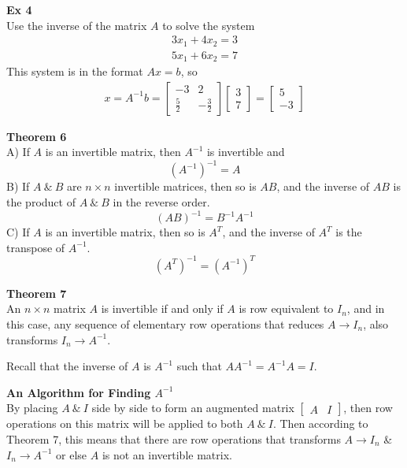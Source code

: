 \documentclass{article}
\begin{document}
  \textbf{Ex 4}\\
  Use the inverse of the matrix $ A $ to solve the system
  \[
      \begin{gathered}
      3x_{1}+4x_{2}=3\\
      5x_{1}+6x_{2}=7    
      \end{gathered}
  \]
  This system is in the format $ Ax=b $, so
  \[
      \begin{gathered}
      x=A^{-1}b = 
      \begin{bmatrix}
          -3 &2\\
          \frac{5}{2} &-\frac{3}{2}  
      \end{bmatrix}
      \begin{bmatrix}
          3\\
          7
      \end{bmatrix} =
      \begin{bmatrix}
          5\\
          -3
      \end{bmatrix}
      \end{gathered}
  \]
  
  \textbf{Theorem 6}\\
  A) If $ A $ is an invertible matrix, then $ A^{-1}$ is invertible and
  \[
    (A^{-1})^{-1}=A 
  \]
  B) If $ A ~\&~ B $ are $ n \times n $ invertible matrices, then so is $ AB $, and the inverse of $ AB $ is the product of $ A ~\&~ B $ in the reverse order.
  \[
    (AB)^{-1}=B^{-1}A^{-1}   
  \]
  C) If $ A $  is an invertible matrix, then so is $ A^{T}  $, and the inverse of $ A^{T}  $ is the transpose of $ A^{-1}  $.
  \[
    (A^{T} )^{-1}=(A^{-1})^{T} 
  \]

  \textbf{Theorem 7}\\
  An $ n \times n $ matrix $ A $ is invertible if and only if $ A $ is row equivalent to $ I_{n}  $, and in this case, any sequence of elementary row operations that reduces $ A \to I_{n} $, also transforms $ I_{n}\to A^{-1} $.
  
  Recall that the inverse of $ A $ is $ A^{-1}  $  such that $ AA^{-1}=A^{-1}A=I$.

  \textbf{An Algorithm for Finding $ A^{-1} $ }\\
  By placing $ A ~\&~ I $ side by side to form an augmented matrix $ \begin{bmatrix}
    A &I
  \end{bmatrix} $, then row operations on this matrix will be applied to both $ A ~\&~ I $. Then according to Theorem 7, this means that there are row operations that transforms $ A \to I_{n} $ \&$ I_{n} \to A^{-1} $ or else $ A $ is not an invertible matrix.     
  
\end{document}
